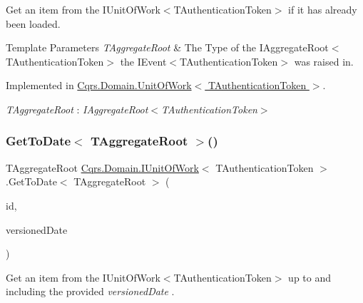 Get an item from the I\+Unit\+Of\+Work$<$\+T\+Authentication\+Token$>$ if it has already been loaded. 


\begin{DoxyTemplParams}{Template Parameters}
{\em T\+Aggregate\+Root} & The Type of the I\+Aggregate\+Root$<$\+T\+Authentication\+Token$>$ the I\+Event$<$\+T\+Authentication\+Token$>$ was raised in.\\
\hline
\end{DoxyTemplParams}


Implemented in \hyperlink{classCqrs_1_1Domain_1_1UnitOfWork_a0592865d52ba0eafb9a5ad1fbdad9729_a0592865d52ba0eafb9a5ad1fbdad9729}{Cqrs.\+Domain.\+Unit\+Of\+Work$<$ T\+Authentication\+Token $>$}.

\begin{Desc}
\item[Type Constraints]\begin{description}
\item[{\em T\+Aggregate\+Root} : {\em I\+Aggregate\+Root$<$T\+Authentication\+Token$>$}]\end{description}
\end{Desc}
\mbox{\label{interfaceCqrs_1_1Domain_1_1IUnitOfWork_a9878de7ddb925b1ef2193b8734d79a3a_a9878de7ddb925b1ef2193b8734d79a3a}} 
\subsubsection{\texorpdfstring{Get\+To\+Date$<$ T\+Aggregate\+Root $>$()}{GetToDate< TAggregateRoot >()}}
{\footnotesize\ttfamily T\+Aggregate\+Root \hyperlink{interfaceCqrs_1_1Domain_1_1IUnitOfWork}{Cqrs.\+Domain.\+I\+Unit\+Of\+Work}$<$ T\+Authentication\+Token $>$.Get\+To\+Date$<$ T\+Aggregate\+Root $>$ (\begin{DoxyParamCaption}\item[{Guid}]{id,  }\item[{Date\+Time}]{versioned\+Date }\end{DoxyParamCaption})}



Get an item from the I\+Unit\+Of\+Work$<$\+T\+Authentication\+Token$>$ up to and including the provided {\itshape versioned\+Date} . 


